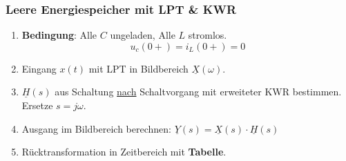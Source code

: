 \subsubsection{Leere Energiespeicher mit LPT \& KWR}
\begin{enumerate}
	\item \textbf{Bedingung}: Alle $C$ ungeladen, Alle $L$ stromlos.
	\[ 
	 u_c(0+) = i_L(0+) = 0
	 \]

	\item Eingang $x(t)$ mit LPT in Bildbereich $\underline{X}(\omega)$.
    \item $\underline{H}(s)$ aus Schaltung \underline{nach}
        Schaltvorgang mit erweiteter KWR bestimmen. Ersetze $s = j\omega $.
    \item Ausgang im Bildbereich berechnen: $\underline{Y}(s) =
        \underline{X}(s)\cdot \underline{H}(s)$
    \item Rücktransformation in Zeitbereich mit \textbf{Tabelle}.
    
\end{enumerate}
